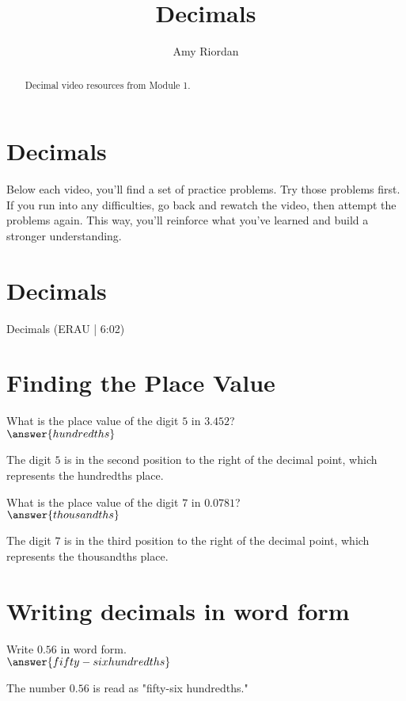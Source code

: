 \documentclass{ximera}
\title{Decimals}
\author{Amy Riordan}
\begin{document}
\begin{abstract}
Decimal video resources from Module 1.
\end{abstract}
\maketitle

\section*{Decimals}

Below each video, you’ll find a set of practice problems. Try those problems first. If you run into any difficulties, go back and rewatch the video, then attempt the problems again. This way, you’ll reinforce what you’ve learned and build a stronger understanding.

\section*{Decimals}

Decimals (ERAU | 6:02)



\section*{Finding the Place Value}
\begin{problem}
What is the place value of the digit $5$ in $3.452$?\\
$\answer{hundredths}$
\begin{feedback}
The digit $5$ is in the second position to the right of the decimal point, which represents the hundredths place.
\end{feedback}
\end{problem}

\begin{problem}
What is the place value of the digit $7$ in $0.0781$?\\
$\answer{thousandths}$
\begin{feedback}
The digit $7$ is in the third position to the right of the decimal point, which represents the thousandths place.
\end{feedback}
\end{problem}

\section*{Writing decimals in word form}
\begin{problem}
Write $0.56$ in word form.\\
$\answer{fifty-six hundredths}$
\begin{feedback}
The number $0.56$ is read as "fifty-six hundredths."
\end{feedback}
\end{problem}
\end{document}
